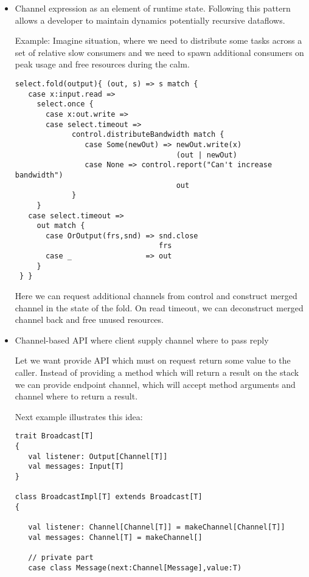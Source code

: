 \documentclass[12pt]{article}
\begin{document}
\begin{itemize}
 \item Channel expression as an element of runtime state. Following this pattern allows a developer to maintain dynamics potentially recursive dataflows. 
 
 Example: 
  Imagine situation, where we need to distribute some tasks across a set of relative slow consumers and we need to spawn additional consumers on peak usage and free resources during the calm. 

\begin{Verbatim}[fontsize=\small]
 select.fold(output){ (out, s) => s match {
   case x:input.read =>
     select.once {
       case x:out.write =>
       case select.timeout =>
             control.distributeBandwidth match {
                case Some(newOut) => newOut.write(x)
                                     (out | newOut)
                case None => control.report("Can't increase bandwidth")
                                     out
             }
     }
   case select.timeout =>
     out match {
       case OrOutput(frs,snd) => snd.close
                                 frs
       case _                 => out
     }
 } }
\end{Verbatim}

 Here we can request additional channels from control and construct merged channel in the state of the fold. On read timeout, we can deconstruct merged channel back and free unused resources.

\item{ Channel-based API where client supply channel where to pass reply }

 Let we want provide API which must on request return some value to the caller. Instead of providing a method which will return a result on the stack we can provide endpoint channel, which will accept method arguments and channel where to return a result. 

 Next example illustrates this idea:

\begin{Verbatim}[fontsize=\small]
trait Broadcast[T]
{
   val listener: Output[Channel[T]]
   val messages: Input[T] 
}

class BroadcastImpl[T] extends Broadcast[T]
{

   val listener: Channel[Channel[T]] = makeChannel[Channel[T]]
   val messages: Channel[T] = makeChannel[]

   // private part
   case class Message(next:Channel[Message],value:T)


\end{Verbatim}
\end{itemize}
\end{document}

